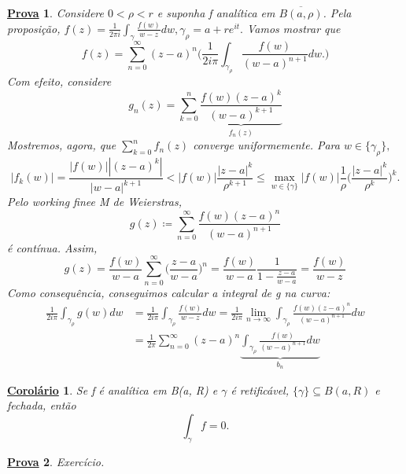 \documentclass{article}
\newtheorem*{proof*}{\underline{Prova}}
\newtheorem*{crl*}{\underline{Corol\'ario}}
\begin{document}
  \begin{proof*}
    Considere $0<\rho<r$ e suponha f anal\'itica em $\overline{B(a, \rho)}$. Pela proposi\c c\~ao, $f(z) =\displaystyle \frac{1}{2\pi i}\int_{\gamma}^{}\frac{f(w)}{w-z}dw,
    \gamma_{\rho} = a + r e^{it}.$ Vamos mostrar que 
    $$  
    f(z) = \sum\limits_{n=0}^{\infty}(z-a)^n\biggl(\frac{1}{2i \pi}\int_{\gamma_{\rho}}^{}\frac{f(w)}{(w-a)^{n+1}}dw.\biggr)
    $$ 
    Com efeito, considere
    $$
    g_{n}(z) = \sum\limits_{k=0}^{n}\underbrace{\frac{f(w)(z-a)^{k}}{(w-a)^{k+1}}}_{f_{n}(z)}
    $$
    Mostremos, agora, que $\sum\limits_{k=0}^{n}f_{n}(z)$ converge uniformemente. Para $w\in{\{\gamma_{\rho}\}},$
    $$
    |f_{k}(w)| = \frac{|f(w)||(z-a)^{k}|}{|w-a|^{k+1}} < |f(w)|\frac{|z-a|^{k}}{\rho^{k+1}}\leq \max_{w\in \{\gamma\}}|f(w)|\frac{1}{\rho}\biggl(\frac{|z-a|^k}{\rho^k}\biggr)^{k}.
    $$
    Pelo working finee M de Weierstras, 
    $$
    g(z)\coloneqq \sum\limits_{n=0}^{\infty}\frac{f(w)(z-a)^{n}}{(w-a)^{n+1}}
    $$
    \'e cont\'inua. Assim,
    $$
    g(z) = \frac{f(w)}{w - a}\sum\limits_{n=0}^{\infty}\biggl(\frac{z-a}{w-a}\biggr)^{n} = \frac{f(w)}{w-a}\frac{1}{1-\frac{z-a}{w-a}} = \frac{f(w)}{w-z}
    $$
    Como consequ\^encia, conseguimos calcular a integral de g na curva:
    \begin{align*}
      \frac{1}{2i \pi}\int_{\gamma_{\rho}}^{}g(w)dw &= \frac{1}{2i \pi}\int_{\gamma_{\rho}}^{}\frac{f(w)}{w-z}dw = \frac{1}{2i \pi}\lim_{n\to\infty}\int_{\gamma_{\rho}}\frac{f(w)(z-a)^{n}}{(w-a)^{n+1}}dw\\
                                                    &= \frac{1}{2\pi}\sum\limits_{n=0}^{\infty}(z-a)^{n}\underbrace{\int_{\gamma_{\rho}}^{}\frac{f(w)}{(w-a)^{n+1}}dw}_{b_{n}}
    \end{align*}
  \end{proof*}
  \begin{crl*}
    Se f \'e anal\'itica em B(a, R) e $\gamma$ \'e retific\'avel, $\{\gamma\}\subseteq{B(a, R)}$ e fechada, ent\~ao
    $$
    \int_{\gamma}^{}f = 0.
    $$
  \end{crl*}
  \begin{proof*}
    Exerc\'icio.
  \end{proof*}
\end{document}
